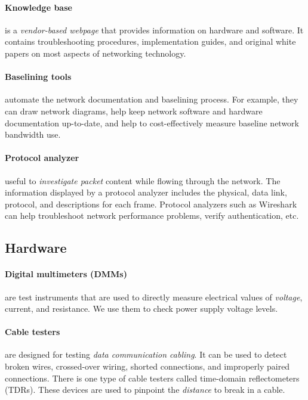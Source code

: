 \paragraph{Knowledge base} is a \emph{vendor-based webpage} that provides information on hardware and software. It contains troubleshooting procedures, implementation guides, and original white papers on most aspects of networking technology.

\paragraph{Baselining tools}automate  the network documentation and baselining process. For example, they can draw network diagrams, help keep network software and hardware documentation up-to-date, and help to cost-effectively measure baseline network bandwidth use.

\paragraph{Protocol analyzer} useful to \emph{investigate packet} content while flowing through the network. The information displayed by a protocol analyzer includes the physical, data link, protocol, and descriptions for each frame. Protocol analyzers such as Wireshark can help troubleshoot network performance problems, verify authentication, etc.

\subsection{Hardware}

\paragraph{Digital multimeters (DMMs)}are test instruments that are used to directly measure electrical values of \emph{voltage}, current, and resistance. We use them to check power supply voltage levels. 

\paragraph{Cable testers} are designed for testing \emph{data communication cabling}. It can be used to detect broken wires, crossed-over wiring, shorted connections, and improperly paired connections. There is one type of cable testers called time-domain reflectometers (TDRs). These devices are used to pinpoint the \emph{distance} to break in a cable.

